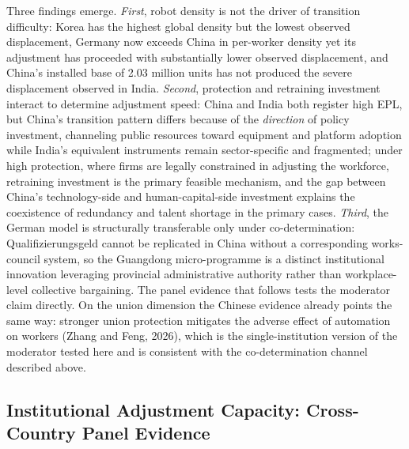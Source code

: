 \documentclass[12pt]{article}
\begin{document}
Three findings emerge. \emph{First}, robot density is not the driver of transition difficulty: Korea has the highest global density but the lowest observed displacement, Germany now exceeds China in per-worker density yet its adjustment has proceeded with substantially lower observed displacement, and China's installed base of 2.03 million units has not produced the severe displacement observed in India. \emph{Second}, protection and retraining investment interact to determine adjustment speed: China and India both register high EPL, but China's transition pattern differs because of the \emph{direction} of policy investment, channeling public resources toward equipment and platform adoption while India's equivalent instruments remain sector-specific and fragmented; under high protection, where firms are legally constrained in adjusting the workforce, retraining investment is the primary feasible mechanism, and the gap between China's technology-side and human-capital-side investment explains the coexistence of redundancy and talent shortage in the primary cases. \emph{Third}, the German model is structurally transferable only under co-determination: Qualifizierungsgeld cannot be replicated in China without a corresponding works-council system, so the Guangdong micro-programme is a distinct institutional innovation leveraging provincial administrative authority rather than workplace-level collective bargaining. The panel evidence that follows tests the moderator claim directly. On the union dimension the Chinese evidence already points the same way: stronger union protection mitigates the adverse effect of automation on workers (Zhang and Feng, 2026), which is the single-institution version of the moderator tested here and is consistent with the co-determination channel described above.

\subsection{Institutional Adjustment Capacity: Cross-Country Panel Evidence}
\end{document}
